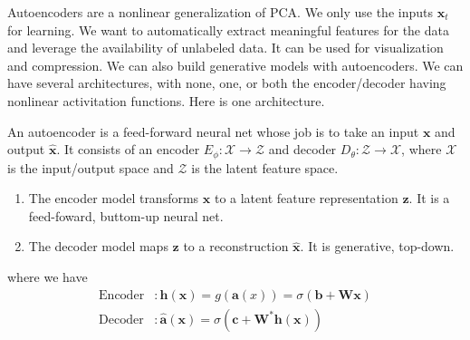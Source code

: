     Autoencoders are a nonlinear generalization of PCA. We only use the inputs $\mathbf{x}_t$ for learning. We want to automatically extract meaningful features for the data and leverage the availability of unlabeled data. It can be used for visualization and compression. We can also build generative models with autoencoders. We can have several architectures, with none, one, or both the encoder/decoder having nonlinear activitation functions. Here is one architecture. 

    \begin{definition}[Autoencoder]
      An autoencoder is a feed-forward neural net whose job is to take an input $\mathbf{x}$ and output $\hat{\mathbf{x}}$. It consists of an encoder $E_\phi: \mathcal{X} \rightarrow \mathcal{Z}$ and decoder $D_\theta: \mathcal{Z} \rightarrow \mathcal{X}$, where $\mathcal{X}$ is the input/output space and $\mathcal{Z}$ is the latent feature space. 

      \begin{enumerate}
        \item The encoder model transforms $\mathbf{x}$ to a latent feature representation $\mathbf{z}$. It is a feed-foward, buttom-up neural net. 
        \item The decoder model maps $\mathbf{z}$ to a reconstruction $\hat{\mathbf{x}}$. It is generative, top-down. 
      \end{enumerate}
      where we have 
      \begin{align*} 
          \mathrm{Encoder} & : \mathbf{h}(\mathbf{x}) = g(\mathbf{a}(x)) = \sigma (\mathbf{b} + \mathbf{W} \mathbf{x}) \\
          \mathrm{Decoder} & : \hat{\mathbf{a}}(\mathbf{x}) = \sigma (\mathbf{c} + \mathbf{W}^\ast \mathbf{h}(\mathbf{x})) 
      \end{align*} 
      \begin{figure}[H]
        \centering 
\end{figure}
\end{definition}
